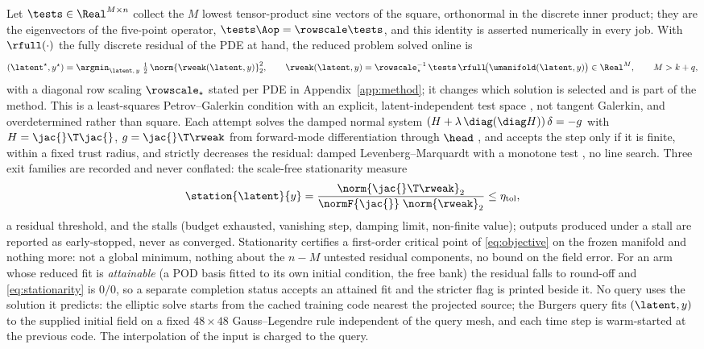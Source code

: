 Let $\tests\in\Real^{M\times n}$ collect the $M$ lowest tensor-product sine
vectors of the square, orthonormal in the discrete inner product; they are the
eigenvectors of the five-point operator, $\tests\Aop=\rowscale\tests$, and this
identity is asserted numerically in every job. With $\rfull(\cdot)$ the fully
discrete residual of the PDE at hand, the reduced problem solved online is
\begin{equation}
  (\latent^{\star},y^{\star})
  =
  \argmin_{\latent,\,y}\;
  \tfrac12\,\norm{\rweak(\latent,y)}_2^2,
  \qquad
  \rweak(\latent,y) = \rowscale_\star^{-1}\,\tests\,\rfull\!\big(\umanifold(\latent,y)\big)
  \in\Real^{M},
  \qquad M>k+q ,
  \label{eq:objective}
\end{equation}
with a diagonal row scaling $\rowscale_\star$ stated per PDE in
Appendix~\ref{app:method}; it changes which solution is selected and is part of
the method. This is a least-squares Petrov--Galerkin condition with an
explicit, latent-independent test space \citep{Carlberg2011LSPG,LeeCarlberg2020},
not tangent Galerkin, and overdetermined rather than square.
Each attempt solves the damped normal system
$(H+\lambda\,\diag(\diag H))\,\delta=-g$ with $H=\jac{}\T\jac{}$, $g=\jac{}\T\rweak$
from forward-mode differentiation through $\head$ \citep{Bradbury2018JAX}, and
accepts the step only if it is finite, within a fixed trust radius, and strictly
decreases the residual: damped Levenberg--Marquardt with a monotone test
\citep{Marquardt1963}, no line search.
Three exit families are recorded and never conflated: the scale-free
stationarity measure
\begin{equation}
  \station{\latent}{y}
  =
  \frac{\norm{\jac{}\T\rweak}_2}{\normF{\jac{}}\;\norm{\rweak}_2}
  \le\eta_{\mathrm{tol}},
  \label{eq:stationarity}
\end{equation}
a residual threshold, and the stalls (budget exhausted, vanishing step, damping
limit, non-finite value); outputs produced under a stall are reported as
early-stopped, never as converged. Stationarity certifies a first-order
critical point of \eqref{eq:objective} on the frozen manifold and nothing
more: not a global minimum, nothing about the $n-M$ untested residual
components, no bound on the field error. For an arm whose reduced fit is
\emph{attainable} (a POD basis fitted to its own initial condition, the free
bank) the residual falls to round-off and \eqref{eq:stationarity} is $0/0$, so
a separate completion status accepts an attained fit and the stricter flag is
printed beside it. No query uses the solution it predicts: the elliptic solve
starts from the cached training code nearest the projected source; the Burgers
query fits $(\latent,y)$ to the supplied initial field on a fixed
$48\times48$ Gauss--Legendre rule independent of the query mesh, and each time
step is warm-started at the previous code. The interpolation of the input is
charged to the query.

